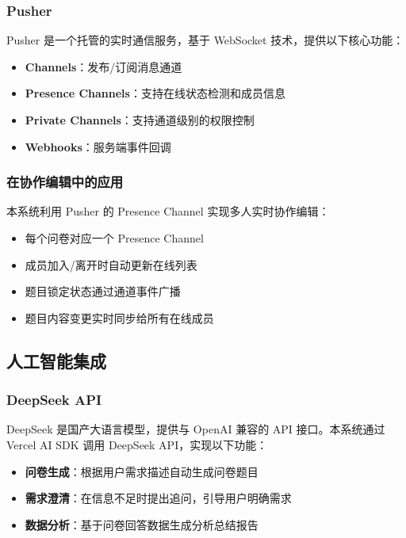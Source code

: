 \subsubsection{Pusher}

Pusher 是一个托管的实时通信服务，基于 WebSocket 技术，提供以下核心功能：

\begin{itemize}
  \item \textbf{Channels}：发布/订阅消息通道
  \item \textbf{Presence Channels}：支持在线状态检测和成员信息
  \item \textbf{Private Channels}：支持通道级别的权限控制
  \item \textbf{Webhooks}：服务端事件回调
\end{itemize}

\subsubsection{在协作编辑中的应用}

本系统利用 Pusher 的 Presence Channel 实现多人实时协作编辑：

\begin{itemize}
  \item 每个问卷对应一个 Presence Channel
  \item 成员加入/离开时自动更新在线列表
  \item 题目锁定状态通过通道事件广播
  \item 题目内容变更实时同步给所有在线成员
\end{itemize}

\subsection{人工智能集成}

\subsubsection{DeepSeek API}

DeepSeek 是国产大语言模型，提供与 OpenAI 兼容的 API 接口。本系统通过 Vercel AI SDK 调用 DeepSeek API，实现以下功能：

\begin{itemize}
  \item \textbf{问卷生成}：根据用户需求描述自动生成问卷题目
  \item \textbf{需求澄清}：在信息不足时提出追问，引导用户明确需求
  \item \textbf{数据分析}：基于问卷回答数据生成分析总结报告
\end{itemize}

